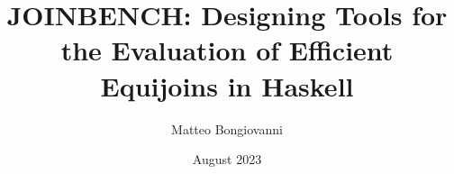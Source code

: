 \documentclass[a4paper, twoside]{report}
\title{JOINBENCH: Designing Tools for the Evaluation of Efficient Equijoins in Haskell}
\author{Matteo Bongiovanni}
\date{August 2023}
\begin{document}
\begin{comment}
General Information
The project report (occasionally referred to as a thesis) is an extremely
important aspect of the project. It serves to show what you have achieved and
should demonstrate that:

You understand the wider context of computing by relating your choice of project,
and the approach you take, to existing products or research.
You can apply the theoretical and practical techniques taught in the course to the
problem you are addressing and that you understand their relevance to the wider
world of computing.
You are capable of objectively criticising your own work and making constructive
suggestions for improvements or further work based on your experiences so far.
As a computing professional, you operate ethically and can explain your thinking
and working processes clearly and concisely to third parties who may not be
experts in the field in which you are working.
Most of the project assessors will not have followed the project throughout and
will only have a short time to listen to a presentation or see a demonstration.
For this reason they will rely heavily on the report to judge the project

Many students underestimate the importance of the report and make the mistake of
thinking that top marks can be achieved simply for producing a good product. This
is fundamentally not the case and many projects have been graded well below their
potential because of an indifferent or poor write-up. In order to get the balance
right you should consider that the aim of the project is to produce a good report
and that software, hardware, theory etc. that you developed during the project are
merely a means to this end. Don't make the mistake of leaving the write-up to the
last minute. Ideally you should produce the bulk of the report as you go along and
use the last week or two to bring it together into a coherent document.

It is helpful to get feedback from your supervisor about your project report, but
supervisors cannot be expected to look at documents written at the last minute or
at more than one chapter at a time. Allow plenty of time for this

Project Report Length
The nominal maximum report length is 60 pages, plus appendices. Shorter reports
may be appropriate for many projects and longer reports can be submitted with
prior approval (see below).

The page count includes:


\end{comment}
\end{document}
